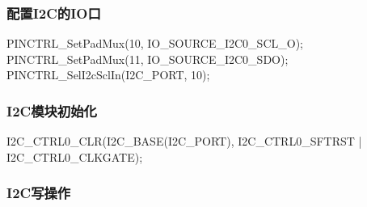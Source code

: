 \documentclass[
  12pt,
]{book}
\newenvironment{Shaded}{\begin{snugshade}}{\end{snugshade}}
\newcommand{\DecValTok}[1]{\textcolor[rgb]{0.00,0.00,0.81}{#1}}
\newcommand{\NormalTok}[1]{#1}
\begin{document}
\hypertarget{ux914dux7f6ei2cux7684ioux53e3}{%
\subsubsection{配置I2C的IO口}\label{ux914dux7f6ei2cux7684ioux53e3}}

\begin{Shaded}
\begin{Highlighting}[]
\NormalTok{    PINCTRL_SetPadMux(}\DecValTok{10}\NormalTok{, IO_SOURCE_I2C0_SCL_O);}
\NormalTok{    PINCTRL_SetPadMux(}\DecValTok{11}\NormalTok{, IO_SOURCE_I2C0_SDO);}
\NormalTok{    PINCTRL_SelI2cSclIn(I2C_PORT, }\DecValTok{10}\NormalTok{);}
\end{Highlighting}
\end{Shaded}

\hypertarget{i2cux6a21ux5757ux521dux59cbux5316}{%
\subsubsection{I2C模块初始化}\label{i2cux6a21ux5757ux521dux59cbux5316}}

\begin{Shaded}
\begin{Highlighting}[]
\NormalTok{I2C_CTRL0_CLR(I2C_BASE(I2C_PORT), I2C_CTRL0_SFTRST | I2C_CTRL0_CLKGATE);}
\end{Highlighting}
\end{Shaded}

\hypertarget{i2cux5199ux64cdux4f5c}{%
\subsubsection{I2C写操作}\label{i2cux5199ux64cdux4f5c}}
\end{document}
